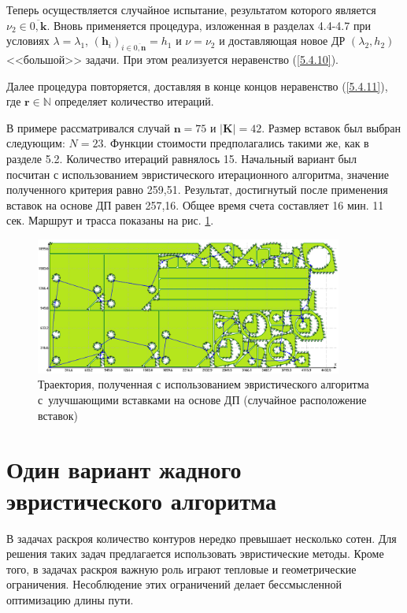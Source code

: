 \documentclass[11pt,twoside,openany]{report}
\begin{document}
{{Теперь осуществляется случайное испытание, результатом которого является
$\nu_2\in \overline{0,\mathbf{k}}$. Вновь применяется процедура, изложенная
в разделах 4.4-4.7 при условиях $\lambda=\lambda_1$,
$(\mathbf{h}_i)_{i\in \overline{0,\mathbf{n}}}=h_1$ и $\nu=\nu_2$ и доставляющая
новое ДР $(\lambda_2,h_2)$ <<большой>> задачи. При этом реализуется неравенство
(\ref{5.4.10}).

Далее процедура повторяется, доставляя в конце концов неравенство (\ref{5.4.11}),
где $\mathbf{r}\in \mathbb{N}$ определяет количество итераций.

В примере рассматривался случай $\mathbf{n}=75$ и $|\mathbf{K}|=42$. Размер вставок
был выбран следующим: $N=23$. Функции стоимости предполагались такими же, как в разделе
5.2. Количество итераций равнялось 15. Начальный вариант был посчитан с использованием
эвристического итерационного алгоритма, значение полученного критерия равно 259,51.
Результат, достигнутый после применения вставок на основе ДП равен 257,16. Общее время
счета составляет 16 мин. 11 сек. Маршрут и трасса показаны на рис.
\ref{DP_Random_Inserts_Result}.

\begin{figure}
  \begin{center}
  \includegraphics[width=0.9\textwidth]{route_random_dp_insertions.png}
  \caption{
    Траектория, полученная с использованием эвристического алгоритма
    с~улучшающими вставками на основе ДП (случайное расположение вставок)}
  \label{DP_Random_Inserts_Result}
  \end{center}
\end{figure}

{\raggedright\section{
  Один вариант жадного эвристического алгоритма
}}
\label{sect:5.6}
\setcounter{equation}{0}

В задачах раскроя количество контуров нередко превышает несколько сотен.
Для решения таких задач предлагается использовать эвристические методы.
Кроме того, в задачах раскроя важную роль играют тепловые и
геометрические ограничения. Несоблюдение этих ограничений делает бессмысленной
оптимизацию длины пути.

}}
\end{document}
